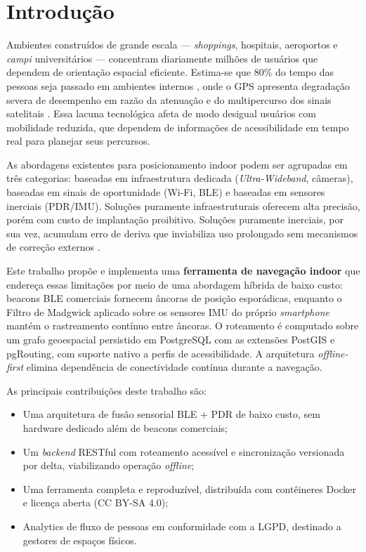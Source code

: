 \documentclass[12pt]{article}
\begin{document}
\section{Introdução}

Ambientes construídos de grande escala --- \textit{shoppings}, hospitais, aeroportos
e \textit{campi} universitários --- concentram diariamente milhões de usuários que
dependem de orientação espacial eficiente. Estima-se que 80\% do tempo das pessoas
seja passado em ambientes internos \cite{Zafari2019}, onde o GPS apresenta degradação
severa de desempenho em razão da atenuação e do multipercurso dos sinais satelitais
\cite{Liu2007}. Essa lacuna tecnológica afeta de modo desigual usuários com mobilidade
reduzida, que dependem de informações de acessibilidade em tempo real para planejar
seus percursos.

As abordagens existentes para posicionamento indoor podem ser agrupadas em três
categorias: baseadas em infraestrutura dedicada (\textit{Ultra-Wideband}, câmeras),
baseadas em sinais de oportunidade (Wi-Fi, BLE) e baseadas em sensores inerciais
(PDR/IMU). Soluções puramente infraestruturais oferecem alta precisão, porém com
custo de implantação proibitivo. Soluções puramente inerciais, por sua vez, acumulam
erro de deriva que inviabiliza uso prolongado sem mecanismos de correção externos
\cite{Jimenez2009}.

Este trabalho propõe e implementa uma \textbf{ferramenta de navegação indoor} que
endereça essas limitações por meio de uma abordagem híbrida de baixo custo: beacons
BLE comerciais fornecem âncoras de posição esporádicas, enquanto o Filtro de Madgwick
aplicado sobre os sensores IMU do próprio \textit{smartphone} mantém o rastreamento
contínuo entre âncoras. O roteamento é computado sobre um grafo geoespacial persistido
em PostgreSQL com as extensões PostGIS e pgRouting, com suporte nativo a perfis de
acessibilidade. A arquitetura \textit{offline-first} elimina dependência de conectividade
contínua durante a navegação.

As principais contribuições deste trabalho são:
\begin{itemize}
  \item Uma arquitetura de fusão sensorial BLE + PDR de baixo custo, sem hardware
        dedicado além de beacons comerciais;
  \item Um \textit{backend} RESTful com roteamento acessível e sincronização versionada
        por delta, viabilizando operação \textit{offline};
  \item Uma ferramenta completa e reproduzível, distribuída com contêineres Docker
        e licença aberta (CC BY-SA 4.0);
  \item Analytics de fluxo de pessoas em conformidade com a LGPD, destinado a
        gestores de espaços físicos.
\end{itemize}
\end{document}
